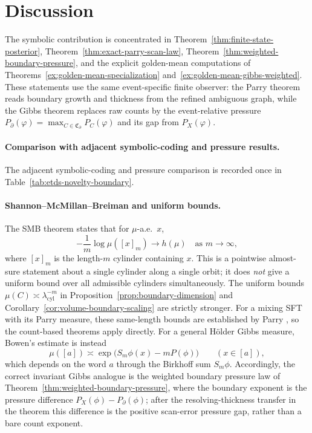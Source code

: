 \documentclass{etds}%
\numberwithin{equation}{section}
\theoremstyle{plain}
\theoremstyle{definition}
\theoremstyle{remark}
\begin{document}
\section{Discussion}
\label{sec:discussion}

The symbolic contribution is concentrated in
Theorem~\ref{thm:finite-state-posterior},
Theorem~\ref{thm:exact-parry-scan-law},
Theorem~\ref{thm:weighted-boundary-pressure}, and the explicit golden-mean
computations of
Theorems~\ref{ex:golden-mean-specialization}
and~\ref{ex:golden-mean-gibbs-weighted}.  These statements use the same
event-specific finite observer: the Parry theorem reads boundary growth and
thickness from the refined ambiguous graph, while the Gibbs theorem replaces
raw counts by the event-relative pressure
$P_\partial(\varphi)=\max_{C\in\mathfrak{C}_\partial}P_C(\varphi)$ and its gap
from $P_X(\varphi)$.

\paragraph{Comparison with adjacent symbolic-coding and pressure results.}
The adjacent symbolic-coding and pressure comparison is recorded once in
Table~\ref{tab:etds-novelty-boundary}.

\paragraph{Shannon--McMillan--Breiman and uniform bounds.}
The SMB theorem \cite{Shannon1948,McMillan1953,Breiman1957} states that for
$\mu$-a.e.\ $x$,
\[
-\frac{1}{m}\log\mu([x]_m)\to h(\mu)
\quad\text{as }m\to\infty,
\]
where $[x]_m$ is the length-$m$ cylinder containing $x$.  This is a pointwise
almost-sure statement about a single cylinder along a single orbit; it does
\emph{not} give a uniform bound over all admissible cylinders simultaneously.
The uniform bounds $\mu(C)\asymp\lambda_{\mathrm{cyl}}^{-m}$ in
Proposition~\ref{prop:boundary-dimension}
and Corollary~\ref{cor:volume-boundary-scaling}
are strictly stronger.  For a mixing SFT with its Parry measure, these
same-length bounds are established by Parry \cite{Parry1964}, so the
count-based theorems apply directly.  For a general H\"older Gibbs measure,
Bowen's estimate \cite{Bowen1975} is instead
\[
\mu([a])\asymp \exp\!\bigl(S_m\phi(x)-mP(\phi)\bigr)\qquad(x\in[a]),
\]
which depends on the word $a$ through the Birkhoff sum $S_m\phi$.
Accordingly, the correct invariant Gibbs analogue is the weighted boundary
pressure law of Theorem~\ref{thm:weighted-boundary-pressure}, where the
boundary exponent is the pressure difference $P_X(\phi)-P_\partial(\phi)$;
after the resolving-thickness transfer in the theorem this difference is the
positive scan-error pressure gap, rather than a bare count exponent.
\end{document}
